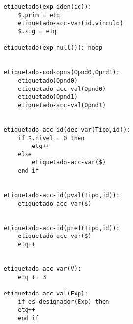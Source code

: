 \begin{lstlisting}
    etiquetado(exp_iden(id)):
        $.prim = etq
        etiquetado-acc-var(id.vinculo)
        $.sig = etq

    etiquetado(exp_null()): noop


    etiquetado-cod-opns(Opnd0,Opnd1):
        etiquetado(Opnd0)
        etiquetado-acc-val(Opnd0)
        etiquetado(Opnd1)
        etiquetado-acc-val(Opnd1)

        
    etiquetado-acc-id(dec_var(Tipo,id)):
        if $.nivel = 0 then
            etq++
        else
            etiquetado-acc-var($)
        end if

        
    etiquetado-acc-id(pval(Tipo,id)):
        etiquetado-acc-var($)

        
    etiquetado-acc-id(pref(Tipo,id)):
        etiquetado-acc-var($)
        etq++

        
    etiquetado-acc-var(V):
        etq += 3

    etiquetado-acc-val(Exp):
        if es-designador(Exp) then
        etq++
        end if


\end{lstlisting}